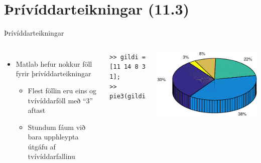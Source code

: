 \documentclass{beamer}
\begin{document}
\section{Þrívíddarteikningar (11.3)}

\begin{frame}[fragile]{Þrívíddarteikningar}
\begin{columns}
\begin{itemize}
 \item Matlab hefur nokkur föll fyrir þrívíddarteikningar
 \begin{itemize}
  \item Flest föllin eru eins og tvívíddarföll með ``3'' aftast
  \item Stundum fáum við bara upphleypta útgáfu af tvívíddarfallinu
 \end{itemize}
\end{itemize}
\begin{verbatim}
>> gildi = [11 14 8 3 1];
>> pie3(gildi)
\end{verbatim}

\includegraphics[width=\linewidth]{Pics/3dpie}
\end{columns}
\end{frame}
\end{document}
